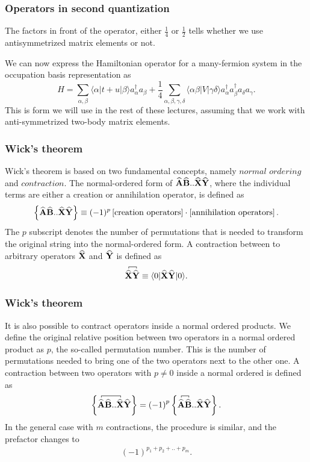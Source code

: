 \documentclass[compress]{beamer}
\newcommand*{\for}[3]{\langle#1|#2|#3\rangle}
\newcommand*{\kpr}[1]{\left\{#1\right\}}
\newcommand*{\ket}[1]{|#1\rangle}
\newcommand*{\bra}[1]{\langle#1|}
\newcommand{\OP}[1]{{\bf\widehat{#1}}}
\newcommand*{\fpr}[1]{\left[#1\right]}
\newcommand*{\pr}[1]{\left(#1\right)}
\newcommand{\element}[3]
        {\bra{#1}#2\ket{#3}}
\begin{document}
\frame
{
  \frametitle{Operators in second quantization}
\begin{small}
{\scriptsize
The factors in front of the operator, either  $\frac{1}{4}$ or 
$\frac{1}{2}$ tells whether we use antisymmetrized matrix elements or not. 

We can now express the Hamiltonian operator for a many-fermion system  in the occupation basis representation
as  
\begin{equation}
	H = \sum_{\alpha, \beta} \element{\alpha}{t+u}{\beta} a_\alpha^\dagger a_\beta + \frac{1}{4} \sum_{\alpha, \beta, \gamma, \delta}
		\element{\alpha \beta}{V}{\gamma \delta} a_\alpha^\dagger a_\beta^\dagger a_\delta a_\gamma. \label{eq:2-46b}
\end{equation}
This is form we will use in the rest of these lectures, assuming that we work with anti-symmetrized two-body matrix elements.
}
\end{small}
}
\frame
{
  \frametitle{Wick's theorem}
\begin{small}
{\scriptsize
Wick's theorem is based on two fundamental concepts, namely $\textit{normal ordering}$ and $\textit{contraction}$. The normal-ordered form of $\OP{A}\OP{B}..\OP{X}\OP{Y}$, where the individual terms are either a creation or annihilation operator, is defined as
\begin{align}
\label{def: Normal ordering}
\kpr{\OP{A}\OP{B}..\OP{X}\OP{Y}} \equiv (-1)^p\fpr{\text{creation operators}}\cdot\fpr{\text{annihilation operators}}.
\end{align}
The $p$ subscript denotes the number of permutations that is needed to transform the original string into the normal-ordered form. A contraction between to arbitrary operators $\OP{X}$ and $\OP{Y}$ is defined as  
\begin{align}
\contraction[0.5ex]{}{\OP{X}}{}{\OP{Y}}{} 
\OP{X}\OP{Y}  \equiv \for{0}{\OP{X}\OP{Y}}{0}.
\end{align}
}
\end{small}
}

\frame
{
  \frametitle{Wick's theorem}
\begin{small}
{\scriptsize
It is also possible to contract operators inside a normal ordered products. We define the  original relative position between two operators in a normal ordered product as $p$, the so-called permutation number. This is the number of permutations needed to bring one of the two operators next to the other one. A contraction between two operators with $p \neq 0$ inside a normal ordered is defined as
\begin{align}
\kpr{\contraction[0.5ex]{}{\OP{A}}{\OP{B}..}{\OP{X}}\OP{A}\OP{B}..\OP{X}\OP{Y}} = \pr{-1}^p \kpr{\contraction[0.5ex]{}{\OP{A}}{}{\OP{B}}\OP{A}\OP{B}..\OP{X}\OP{Y}}.
\end{align}
In the general case with $m$ contractions, the procedure is similar, and the prefactor changes to 
\begin{align}
\pr{-1}^{p_1 + p_2 + .. + p_m}.
\end{align} 
}
\end{small}
}
\end{document}
